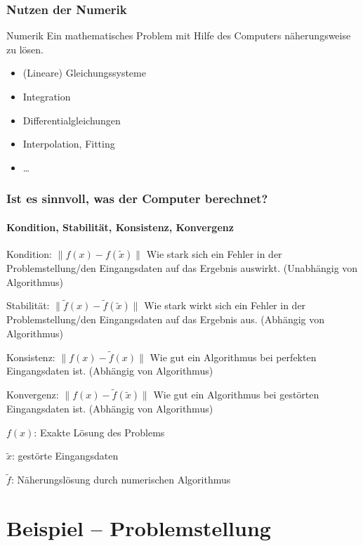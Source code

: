 \documentclass{beamer}
\begin{document}
\begin{frame}\frametitle{Nutzen der Numerik}
    \begin{block}{Numerik}
      Ein mathematisches Problem mit Hilfe des Computers näherungsweise zu lösen.
    \end{block}
    \pause
      \begin{itemize}
        \item (Lineare) Gleichungssysteme
        \item Integration
        \item Differentialgleichungen
        \item Interpolation, Fitting
        \item \dots
      \end{itemize}
\end{frame} 


\begin{frame}\frametitle{Ist es sinnvoll, was der Computer berechnet?}
  \framesubtitle{Kondition, Stabilität, Konsistenz, Konvergenz}
  \fontsize{8}{7.2}\selectfont
  \begin{block}{Kondition: $\|f(x) - f(\tilde{x})\|$}
    Wie stark sich ein Fehler in der Problemstellung/den Eingangsdaten auf das Ergebnis auswirkt.
    (Unabhängig von Algorithmus)
  \end{block}
  \begin{block}{Stabilität: $\|\tilde{f}(x) - \tilde{f}(\tilde{x})\|$}
    Wie stark wirkt sich ein Fehler in der Problemstellung/den Eingangsdaten auf das Ergebnis aus.
    (Abhängig von Algorithmus)
  \end{block}
  \begin{block}{Konsistenz: $\|f(x) - \tilde{f}(x)\|$}
    Wie gut ein Algorithmus bei perfekten Eingangsdaten ist.
    (Abhängig von Algorithmus)
  \end{block}
  \begin{block}{Konvergenz: $\|f(x) - \tilde{f}(\tilde{x})\|$}
    Wie gut ein Algorithmus bei gestörten Eingangsdaten ist.
    (Abhängig von Algorithmus)
  \end{block}

  $f(x)$: Exakte Lösung des Problems

  $\tilde x$: gestörte Eingangsdaten

  $\tilde f$: Näherungslösung durch numerischen Algorithmus
\end{frame} 

\section{Beispiel -- Problemstellung}
\end{document}
